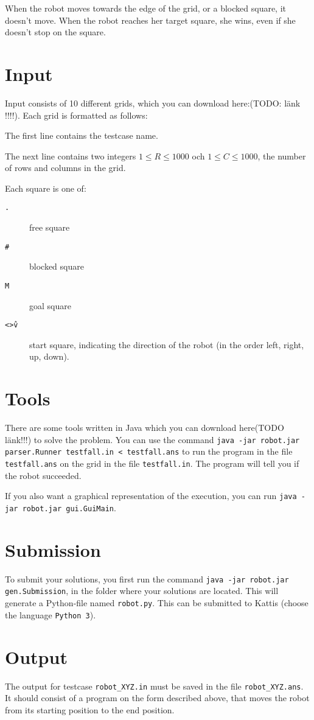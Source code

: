 When the robot moves towards the edge of the grid, or a blocked square, it doesn't move. When the robot reaches her target square, she wins, even if she doesn't stop on the square.

\section*{Input}
Input consists of 10 different grids, which you can download here:(TODO: länk !!!!). Each grid is formatted as follows:

The first line contains the testcase name.

The next line contains two integers $1 \le R \le 1000$ och $1 \le C \le 1000$, the number of rows and columns in the grid.

Each square is one of:
\begin{description}
  \item[\texttt{.}] free square
  \item[\texttt{\#}] blocked square
  \item[\texttt{M}] goal square
  \item[\texttt{<>\^v}] start square, indicating the direction of the robot (in the order left, right, up, down).
\end{description}

\section*{Tools}
There are some tools written in Java which you can download here(TODO länk!!!) to solve the problem. You can use the command \texttt{java -jar robot.jar parser.Runner testfall.in < testfall.ans} 
to run the program in the file \texttt{testfall.ans} on the grid in the file \texttt{testfall.in}. The program will tell you if the robot succeeded.

If you also want a graphical representation of the execution, you can run \texttt{java -jar robot.jar gui.GuiMain}.

\section*{Submission}
To submit your solutions, you first run the command \texttt{java -jar robot.jar gen.Submission}, in the folder where your solutions are located. This will generate a Python-file named \texttt{robot.py}.
This can be submitted to Kattis (choose the language \texttt{Python 3}).

\section*{Output}
The output for testcase \texttt{robot\_XYZ.in} must be saved in the file \texttt{robot\_XYZ.ans}. It should consist of a program on the form described above, that moves the robot from its starting position to the end position.

